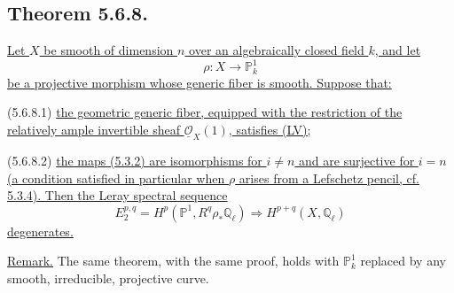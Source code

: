 \subsection*{Theorem 5.6.8.}
\underline{Let $X$ be smooth of dimension $n$ over an algebraically closed
field $k$, and let}
\[
\rho:X\longrightarrow\mathbb P^1_k
\]
\underline{be a projective morphism whose generic fiber is smooth.  Suppose
that:}

\smallskip
\noindent
\textup{(5.6.8.1)}\quad
\underline{the geometric generic fiber, equipped with the restriction of the
relatively ample invertible sheaf $\underline{\mathcal O}_X(1)$, satisfies
(LV);}

\smallskip
\noindent
\textup{(5.6.8.2)}\quad
\underline{the maps (5.3.2) are isomorphisms for $i\neq n$ and are
surjective for $i=n$ (a condition satisfied in particular when $\rho$ arises
from a Lefschetz pencil, cf. 5.3.4).  Then the Leray spectral sequence}
\[
E_2^{p,q}=H^p(\mathbb P^1,R^q\rho_*\mathbb Q_\ell)
\Longrightarrow H^{p+q}(X,\mathbb Q_\ell)
\]
\underline{degenerates.}

\smallskip
\noindent
\underline{Remark.}
The same theorem, with the same proof, holds with $\mathbb P^1_k$ replaced
by any smooth, irreducible, projective curve.

